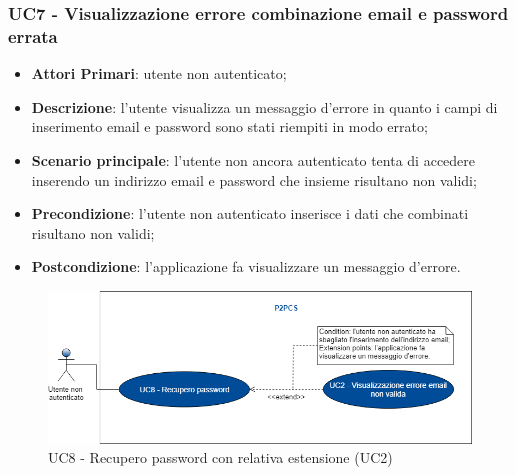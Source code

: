 \subsubsection{UC7 - Visualizzazione errore combinazione email e password errata}
\begin{itemize}
	\item \textbf{Attori Primari}: utente non autenticato;
	\item \textbf{Descrizione}: l'utente visualizza un messaggio d'errore in quanto i campi di inserimento email e password sono stati riempiti in modo errato;
	\item \textbf{Scenario principale}: l'utente non ancora autenticato tenta di accedere inserendo un indirizzo email e password che insieme risultano non validi;	
	\item \textbf{Precondizione}: l'utente non autenticato inserisce i dati che combinati risultano non validi;
	\item \textbf{Postcondizione}: l'applicazione fa visualizzare un messaggio d'errore.
\end{itemize}
\begin{figure}[h]
	\includegraphics[width=15cm]{res/images/Schemagenerale3.png}
	\centering
	\caption{UC8 - Recupero password con relativa estensione (UC2)}
\end{figure}
